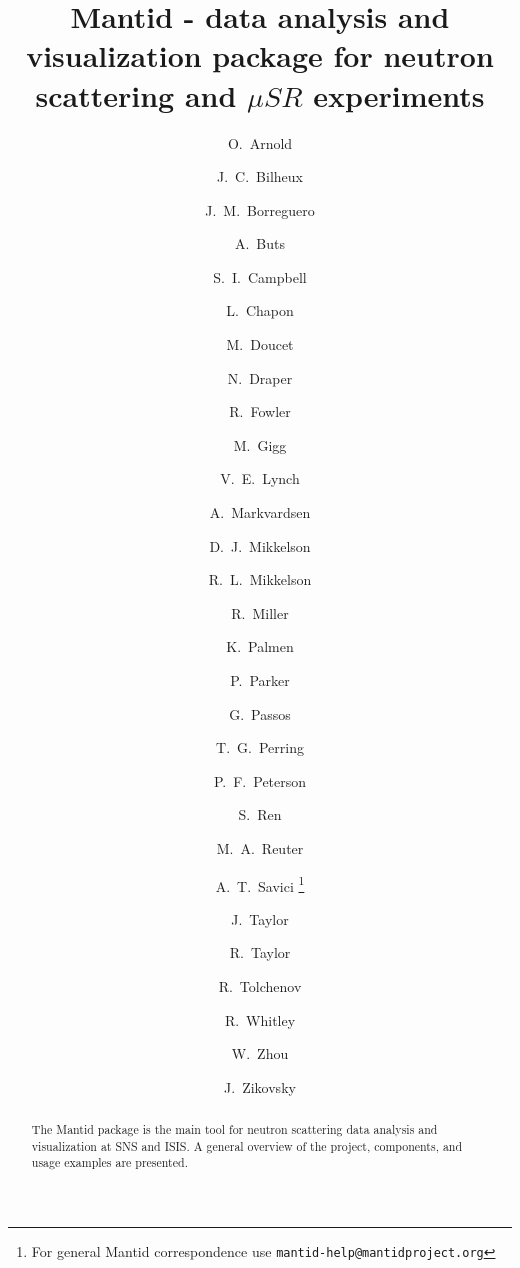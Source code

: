 \documentclass{elsarticle}
\begin{document}
\begin{frontmatter}



\title{Mantid - data analysis and visualization package for neutron scattering and $\mu SR$ experiments}

\author[tessellaUK]{O.~Arnold}
\author[ornl]{J.~C.~Bilheux}
\author[ornl]{J.~M.~Borreguero}
\author[isis]{A.~Buts}
\author[ornl]{S.~I.~Campbell}
\author[ill]{L.~Chapon}
\author[ornl]{M.~Doucet}
\author[tessellaUK]{N.~Draper}
\author[isis]{R.~Fowler}
\author[tessellaUK]{M.~Gigg}
\author[ornl]{V.~E.~Lynch}
\author[isis]{A.~Markvardsen}
\author[uws,ornl]{D.~J.~Mikkelson}
\author[uws,ornl]{R.~L.~Mikkelson}
\author[ornl]{R.~Miller}
\author[isis]{K.~Palmen}
\author[isis]{P.~Parker}
\author[isis]{G.~Passos}
\author[isis]{T.~G.~Perring}
\author[ornl]{P.~F.~Peterson}
\author[ornl]{S.~Ren}
\author[ornl]{M.~A.~Reuter}
\author[ornl]{A.~T.~Savici \footnote{For general Mantid correspondence use \texttt{mantid-help@mantidproject.org}}}
\author[isis]{J.~Taylor}
\author[tessellaUS]{R.~Taylor}
\author[tessellaUK]{R.~Tolchenov}
\author[isis]{R.~Whitley}
\author[ornl]{W.~Zhou}
\author[ornl]{J.~Zikovsky}

\address[ornl]{Neutron Data Analysis and Visualization, Oak Ridge National Laboratory, Oak~Ridge,~TN,~USA}
\address[tessellaUK]{Tessella Ltd., Abingdon, Oxfordshire, UK}
\address[isis]{ISIS Facility, Rutherford Appleton Laboratory, Chilton, Didcot, Oxfordshire, UK}
\address[ill]{Institut Laue-Langevin, Grenoble, France}
\address[uws]{University of Wisconsin-Stout, Menomonie, WI, USA}
\address[tessellaUS]{Tessella Inc., Newton, MA, USA}



\begin{abstract}
The Mantid  package is the main tool for neutron scattering data analysis and visualization at SNS and ISIS. A general overview of the project, components, and usage examples are presented. 
\end{abstract}


\end{frontmatter}
\end{document}
